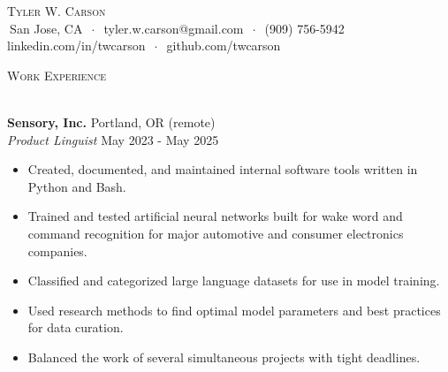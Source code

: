 \documentclass[]{article}
\newcommand{\lineunder} {
	\vspace*{-8pt} \\
	\hspace*{-18pt} \hrulefill \\
}
\newcommand{\header} [1] {
	{\hspace*{-18pt}\vspace*{6pt} \textsc{#1}}
	\vspace*{-6pt} \lineunder
}
\begin{document}
	\vspace*{-40pt}
	
	
	\vspace*{-10pt}
	\begin{center}
		{\Huge \scshape {Tyler W. Carson}}\\
		$\ $San Jose, CA $\ \cdot\ $ tyler.w.carson@gmail.com $\ \cdot\ $ (909) 756-5942\\ linkedin.com/in/twcarson $\ \cdot\ $ github.com/twcarson\\
	\end{center}
	
	
	\header{Work Experience}
	\vspace{1mm}
	
	\textbf{Sensory, Inc.} \hfill Portland, OR (remote)\\
	\textit{Product Linguist} \hfill May 2023 - May 2025\\
	\vspace{-3mm}
	\begin{itemize} \itemsep 0pt
		\item Created, documented, and maintained internal software tools written in Python and Bash.
		\item Trained and tested artificial neural networks built for wake word and command recognition for major automotive and consumer electronics companies.
		\item Classified and categorized large language datasets for use in model training.
		\item Used research methods to find optimal model parameters and best practices for data curation.
		\item Balanced the work of several simultaneous projects with tight deadlines.
	\end{itemize}
	
\end{document}
